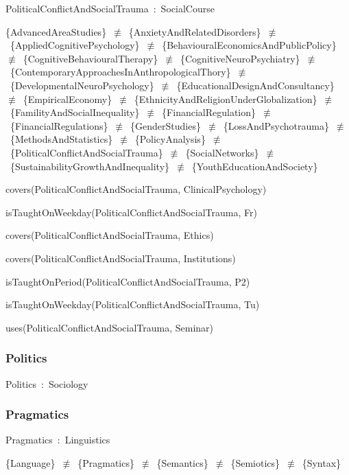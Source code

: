 \documentclass{article}
\begin{document}
PoliticalConflictAndSocialTrauma~:~SocialCourse

\{AdvancedAreaStudies\}~\ensuremath{\not\equiv}~\{AnxietyAndRelatedDisorders\}~\ensuremath{\not\equiv}~\{AppliedCognitivePsychology\}~\ensuremath{\not\equiv}~\{BehaviouralEconomicsAndPublicPolicy\}~\ensuremath{\not\equiv}~\{CognitiveBehaviouralTherapy\}~\ensuremath{\not\equiv}~\{CognitiveNeuroPsychiatry\}~\ensuremath{\not\equiv}~\{ContemporaryApproachesInAnthropologicalThory\}~\ensuremath{\not\equiv}~\{DevelopmentalNeuroPsychology\}~\ensuremath{\not\equiv}~\{EducationalDesignAndConsultancy\}~\ensuremath{\not\equiv}~\{EmpiricalEconomy\}~\ensuremath{\not\equiv}~\{EthnicityAndReligionUnderGlobalization\}~\ensuremath{\not\equiv}~\{FamilityAndSocialInequality\}~\ensuremath{\not\equiv}~\{FinancialRegulation\}~\ensuremath{\not\equiv}~\{FinancialRegulations\}~\ensuremath{\not\equiv}~\{GenderStudies\}~\ensuremath{\not\equiv}~\{LossAndPsychotrauma\}~\ensuremath{\not\equiv}~\{MethodsAndStatistics\}~\ensuremath{\not\equiv}~\{PolicyAnalysis\}~\ensuremath{\not\equiv}~\{PoliticalConflictAndSocialTrauma\}~\ensuremath{\not\equiv}~\{SocialNetworks\}~\ensuremath{\not\equiv}~\{SustainabilityGrowthAndInequality\}~\ensuremath{\not\equiv}~\{YouthEducationAndSociety\}

covers(PoliticalConflictAndSocialTrauma, ClinicalPsychology)

isTaughtOnWeekday(PoliticalConflictAndSocialTrauma, Fr)

covers(PoliticalConflictAndSocialTrauma, Ethics)

covers(PoliticalConflictAndSocialTrauma, Institutions)

isTaughtOnPeriod(PoliticalConflictAndSocialTrauma, P2)

isTaughtOnWeekday(PoliticalConflictAndSocialTrauma, Tu)

uses(PoliticalConflictAndSocialTrauma, Seminar)

\subsubsection*{Politics}

Politics~:~Sociology

\subsubsection*{Pragmatics}

Pragmatics~:~Linguistics

\{Language\}~\ensuremath{\not\equiv}~\{Pragmatics\}~\ensuremath{\not\equiv}~\{Semantics\}~\ensuremath{\not\equiv}~\{Semiotics\}~\ensuremath{\not\equiv}~\{Syntax\}
\end{document}
